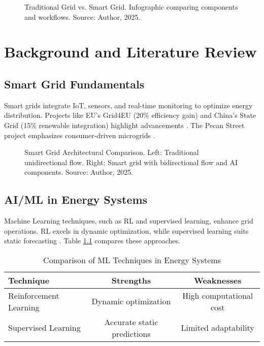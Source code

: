 \documentclass[12pt]{report}
\begin{document}
\begin{figure}[h]
  \centering
  \caption{Traditional Grid vs. Smart Grid. Infographic comparing components and workflows. Source: Author, 2025.}
  \label{fig:grid_comparison}
\end{figure}

\clearpage
\chapter{Background and Literature Review}
\label{chap:literature}
\section{Smart Grid Fundamentals}
Smart grids integrate IoT, sensors, and real-time monitoring to optimize energy distribution. Projects like EU's Grid4EU (20\% efficiency gain) and China's State Grid (15\% renewable integration) highlight advancements \cite{grid4eu2022}. The Pecan Street project emphasizes consumer-driven microgrids \cite{pecan2023}.

\begin{figure}[h]
  \centering
  \caption{Smart Grid Architectural Comparison. Left: Traditional unidirectional flow. Right: Smart grid with bidirectional flow and AI components. Source: Author, 2025.}
  \label{fig:smart_grid_arch}
\end{figure}

\section{AI/ML in Energy Systems}
Machine Learning techniques, such as RL and supervised learning, enhance grid operations. RL excels in dynamic optimization, while supervised learning suits static forecasting \cite{zhou2021}. Table \ref{tab:ml_comparison} compares these approaches.

\begin{table}[h]
  \centering
  \caption{Comparison of ML Techniques in Energy Systems}
  \label{tab:ml_comparison}
  \begin{tabular}{l c c}
    \toprule
    Technique & Strengths & Weaknesses \\
    \midrule
    Reinforcement Learning & Dynamic optimization & High computational cost \\
    Supervised Learning & Accurate static predictions & Limited adaptability \\
    \bottomrule
  \end{tabular}
\end{table}
\end{document}
